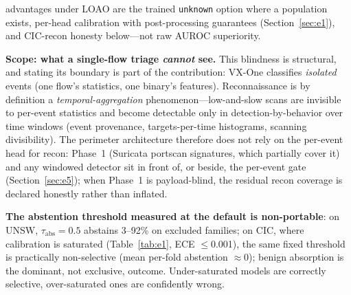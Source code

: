 \documentclass[sigconf,anonymous=false]{acmart}
\begin{document}
advantages under LOAO are the trained \texttt{unknown} option where a population exists, per-head calibration with post-processing guarantees (Section~\ref{sec:e1}), and CIC-recon honesty below---not raw AUROC superiority.

\textbf{Scope: what a single-flow triage \emph{cannot} see.} This blindness is structural, and stating its boundary is part of the contribution: VX-One classifies \emph{isolated} events (one flow's statistics, one binary's features). Reconnaissance is by definition a \emph{temporal-aggregation} phenomenon---low-and-slow scans are invisible to per-event statistics and become detectable only in detection-by-behavior over time windows (event provenance, targets-per-time histograms, scanning divisibility). The perimeter architecture therefore does not rely on the per-event head for recon: Phase~1 (Suricata portscan signatures, which partially cover it) and any windowed detector sit in front of, or beside, the per-event gate (Section~\ref{sec:e5}); when Phase~1 is payload-blind, the residual recon coverage is declared honestly rather than inflated.

\textbf{The abstention threshold measured at the default is non-portable}: on UNSW, $\tau_{\mathrm{abs}}=0.5$ abstains 3--92\% on excluded families; on CIC, where calibration is saturated (Table~\ref{tab:e1}, ECE $\le$0.001), the same fixed threshold is practically non-selective (mean per-fold abstention $\approx0$); benign absorption is the dominant, not exclusive, outcome. Under-saturated models are correctly selective, over-saturated ones are confidently wrong.
\end{document}
